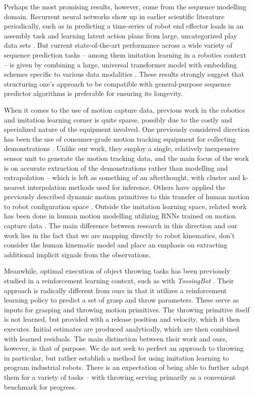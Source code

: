 \documentclass{article}
\begin{document}
Perhaps the most promising results, however, come from the sequence modelling domain. Recurrent neural networks show up in earlier scientific literature periodically, such as in predicting a time-series of robot end effector loads in an assembly task \citep{scherzinger2019contact} and learning latent action plans from large, uncategorized play data sets \citep{lynch2020learning}. But current state-of-the-art performance across a wide variety of sequence prediction tasks -- among them imitation learning in a robotics context -- is given by combining a large, universal transformer model with embedding schemes specific to various data modalities \citep{reed2022generalist}. These results strongly suggest that structuring one's approach to be compatible with general-purpose sequence predictor algorithms is preferable for ensuring its longevity.

When it comes to the use of motion capture data, previous work in the robotics and imitation learning corner is quite sparse, possibly due to the costly and specialized nature of the equipment involved. One previously considered direction has been the use of consumer-grade motion tracking equipment for collecting demonstrations \citep{jha2017imitation}. Unlike our work, they employ a single, relatively inexpensive sensor unit to generate the motion tracking data, and the main focus of the work is on accurate extraction of the demonstrations rather than modelling and extrapolation -- which is left as something of an afterthought, with cluster and k-nearest interpolation methods used for inference. Others have applied the previously described dynamic motion primitives to this transfer of human motion to robot configuration space \citep{vuga2013mocap}. Outside the imitation learning space, related work has been done in human motion modelling utilizing RNNs trained on motion capture data \citep{Fragkiadaki_2015_ICCV,pavllo2018quaternet}. The main difference between research in this direction and our work lies in the fact that we are mapping directly to robot kinematics, don't consider the human kinematic model and place an emphasis on extracting additional implicit signals from the observations. 

Meanwhile, optimal execution of object throwing tasks has been previously studied in a reinforcement learning context, such as with \emph{TossingBot} \citep{zeng2020tossingbot}. Their approach is radically different from ours in that it utilizes a reinforcement learning policy to predict a set of grasp and throw parameters. These serve as inputs for grasping and throwing motion primitives. The throwing primitive itself is not learned, but provided with a release position and velocity, which it then executes. Initial estimates are produced analytically, which are then combined with learned residuals. The main distinction between their work and ours, however, is that of purpose. We do not seek to perfect an approach to throwing in particular, but rather establish a method for using imitation learning to program industrial robots. There is an expectation of being able to further adapt them for a variety of tasks -- with throwing serving primarily as a convenient benchmark for progress.
\end{document}
